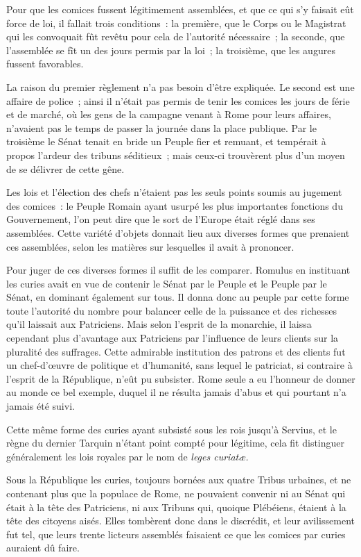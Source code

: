 \documentclass[french,twoside]{book} %
\begin{document}
Pour que les comices fussent légitimement assemblées, et que ce qui s’y faisait eût force de loi, il fallait trois conditions : la première, que le Corps ou le Magistrat qui les convoquait fût revêtu pour cela de l’autorité nécessaire ; la seconde, que l’assemblée se fît un des jours permis par la loi ; la troisième, que les augures fussent favorables.\par
La raison du premier règlement n’a pas besoin d’être expliquée. Le second est une affaire de police ; ainsi il n’était pas permis de tenir les comices les jours de férie et de marché, où les gens de la campagne venant à Rome pour leurs affaires, n’avaient pas le temps de passer la journée dans la place publique. Par le troisième le Sénat tenait en bride un Peuple fier et remuant, et tempérait à propos l’ardeur des tribuns séditieux ; mais ceux-ci trouvèrent plus d’un moyen de se délivrer de cette gêne.\par
Les lois et l’élection des chefs n’étaient pas les seuls points soumis au jugement des comices : le Peuple Romain ayant usurpé les plus importantes fonctions du Gouvernement, l’on peut dire que le sort de l’Europe était réglé dans ses assemblées. Cette variété d’objets donnait lieu aux diverses formes que prenaient ces assemblées, selon les matières sur lesquelles il avait à prononcer.\par
Pour juger de ces diverses formes il suffit de les comparer. Romulus en instituant les curies avait en vue de contenir le Sénat par le Peuple et le Peuple par le Sénat, en dominant également sur tous. Il donna donc au peuple par cette forme toute l’autorité du nombre pour balancer celle de la puissance et des richesses qu’il laissait aux Patriciens. Mais selon l’esprit de la monarchie, il laissa cependant plus d’avantage aux Patriciens par l’influence de leurs clients sur la pluralité des suffrages. Cette admirable institution des patrons et des clients fut un chef-d’œuvre de politique et d’humanité, sans lequel le patriciat, si contraire à l’esprit de la République, n’eût pu subsister. Rome seule a eu l’honneur de donner au monde ce bel exemple, duquel il ne résulta jamais d’abus et qui pourtant n’a jamais été suivi.\par
Cette même forme des curies ayant subsisté sous les rois jusqu’à Servius, et le règne du dernier Tarquin n’étant point compté pour légitime, cela fit distinguer généralement les lois royales par le nom de {\itshape leges curiatæ.}\par
Sous la République les curies, toujours bornées aux quatre Tribus urbaines, et ne contenant plus que la populace de Rome, ne pouvaient convenir ni au Sénat qui était à la tête des Patriciens, ni aux Tribuns qui, quoique Plébéiens, étaient à la tête des citoyens aisés. Elles tombèrent donc dans le discrédit, et leur avilissement fut tel, que leurs trente licteurs assemblés faisaient ce que les comices par curies auraient dû faire.\par
\end{document}

